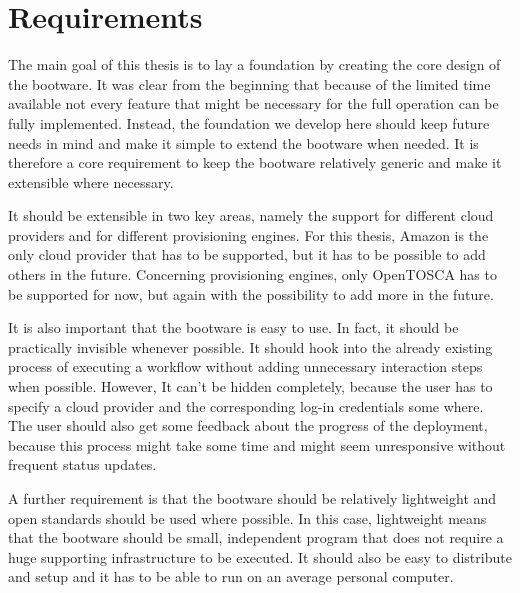 \section{Requirements}

The main goal of this thesis is to lay a foundation by creating the core design of the bootware.
It was clear from the beginning that because of the limited time available not every feature that might be necessary for the full operation can be fully implemented.
Instead, the foundation we develop here should keep future needs in mind and make it simple to extend the bootware when needed.
It is therefore a core requirement to keep the bootware relatively generic and make it extensible where necessary.

It should be extensible in two key areas, namely the support for different cloud providers and for different provisioning engines.
For this thesis, Amazon is the only cloud provider that has to be supported, but it has to be possible to add others in the future.
Concerning provisioning engines, only OpenTOSCA has to be supported for now, but again with the possibility to add more in the future.

It is also important that the bootware is easy to use.
In fact, it should be practically invisible whenever possible.
It should hook into the already existing process of executing a workflow without adding unnecessary interaction steps when possible.
However, It can't be hidden completely, because the user has to specify a cloud provider and the corresponding log-in credentials some where.
The user should also get some feedback about the progress of the deployment, because this process might take some time and might seem unresponsive without frequent status updates.

A further requirement is that the bootware should be relatively lightweight and open standards should be used where possible.
In this case, lightweight means that the bootware should be small, independent program that does not require a huge supporting infrastructure to be executed.
It should also be easy to distribute and setup and it has to be able to run on an average personal computer.
